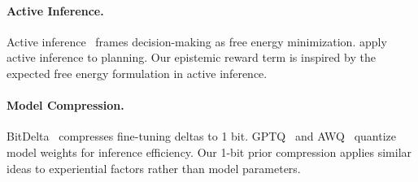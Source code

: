 \paragraph{Active Inference.}
Active inference~\cite{friston2017active, parr2022active} frames
decision-making as free energy minimization. \cite{sajid2021active} apply
active inference to planning. Our epistemic reward term is inspired by the
expected free energy formulation in active inference.

\paragraph{Model Compression.}
BitDelta~\cite{liu2024bitdelta} compresses fine-tuning deltas to 1 bit.
GPTQ~\cite{frantar2023gptq} and AWQ~\cite{lin2024awq} quantize model weights
for inference efficiency. Our 1-bit prior compression applies similar ideas to
experiential factors rather than model parameters.

